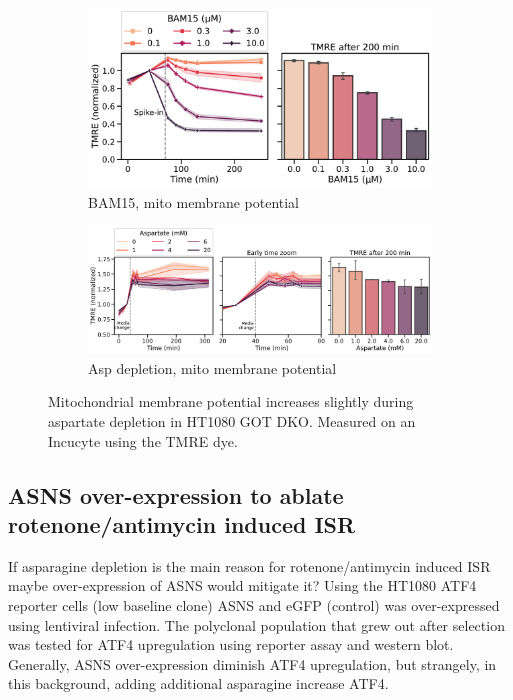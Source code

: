 \begin{figure}[!ht]
     \centering
     \begin{subfigure}[b]{0.6\textwidth}
         \includegraphics[width=\textwidth]{figures/sapp/ISR/HT1080_GOT_DKO_TMRA_BAM15tit.pdf}
         \caption{BAM15, mito membrane potential}
         \label{fig:sapp:ISR:HT1080_GOT_DKO_TMRA_BAM15tit}
     \end{subfigure}
     \hfill
     \begin{subfigure}[b]{0.85\textwidth}
         \includegraphics[width=\textwidth]{figures/sapp/ISR/HT1080_GOT_DKO_TMRA_ASPtit.pdf}
         \caption{Asp depletion, mito membrane potential}
         \label{fig:sapp:ISR:HT1080_GOT_DKO_TMRA_ASPtit}
     \end{subfigure}
     \hfill
        \caption[Mito membrane potential in GOT DKO]{
        Mitochondrial membrane potential increases slightly during aspartate depletion in HT1080 GOT DKO.
        Measured on an Incucyte using the TMRE dye.
        }
        \label{fig:sapp:ISR:HT1080_GOT_DKO_TMRE}
\end{figure}











\FloatBarrier
\subsection{ASNS over-expression to ablate rotenone/antimycin induced ISR}
If asparagine depletion is the main reason for rotenone/antimycin induced ISR maybe over-expression of ASNS would mitigate it?
Using the HT1080 ATF4 reporter cells (low baseline clone) ASNS and eGFP (control) was over-expressed using lentiviral infection.
The polyclonal population that grew out after selection was tested for ATF4 upregulation using reporter assay and western blot.
Generally, ASNS over-expression diminish ATF4 upregulation, but strangely, in this background, adding additional asparagine increase ATF4.

